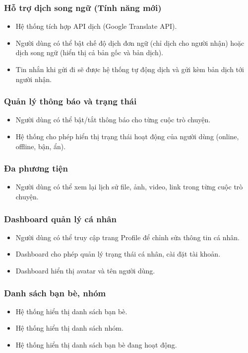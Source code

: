 \documentclass[a4paper, 12pt]{article}
\begin{document}
	\subsubsection{Hỗ trợ dịch song ngữ (Tính năng mới)}
	\begin{itemize}
		\item Hệ thống tích hợp API dịch (Google Translate API).
		\item Người dùng có thể bật chế độ dịch đơn ngữ (chỉ dịch cho người nhận) hoặc dịch song ngữ (hiển thị cả bản gốc và bản dịch).
		\item Tin nhắn khi gửi đi sẽ được hệ thống tự động dịch và gửi kèm bản dịch tới người nhận.
	\end{itemize}
	
	\subsubsection{Quản lý thông báo và trạng thái}
	\begin{itemize}
		\item Người dùng có thể bật/tắt thông báo cho từng cuộc trò chuyện.
		\item Hệ thống cho phép hiển thị trạng thái hoạt động của người dùng (online, offline, bận, ẩn).
	\end{itemize}
	
	\subsubsection{Đa phương tiện}
	\begin{itemize}
		\item Người dùng có thể xem lại lịch sử file, ảnh, video, link trong từng cuộc trò chuyện.
	\end{itemize}
	
	\subsubsection{Dashboard quản lý cá nhân}
	\begin{itemize}
		\item Người dùng có thể truy cập trang Profile để chỉnh sửa thông tin cá nhân.
		\item Dashboard cho phép quản lý trạng thái cá nhân, cài đặt tài khoản.
		\item Dashboard hiển thị avatar và tên người dùng.
	\end{itemize}
	
	\subsubsection{Danh sách bạn bè, nhóm}
	\begin{itemize}
		\item Hệ thống hiển thị danh sách bạn bè.
		\item Hệ thống hiển thị danh sách nhóm.
		\item Hệ thống hiển thị danh sách bạn bè đang hoạt động.
	\end{itemize}
	
\end{document}
